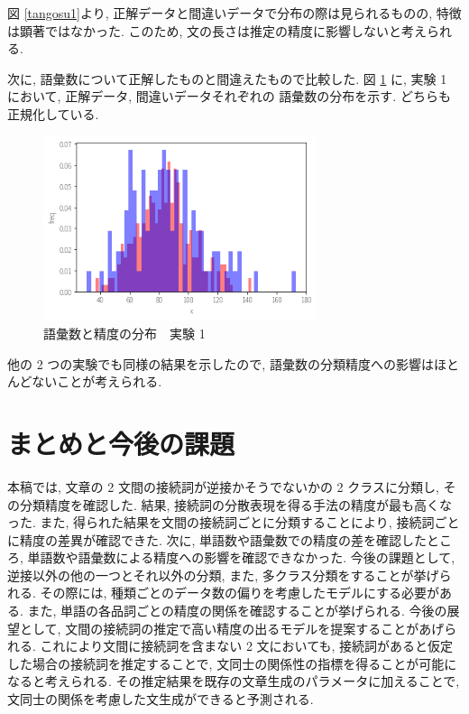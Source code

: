 \documentclass[twocolumn]{jarticle}     %
\begin{document}
図 \ref{tangosu1}より, 正解データと間違いデータで分布の際は見られるものの, 特徴は顕著ではなかった.
このため, 文の長さは推定の精度に影響しないと考えられる. \par
次に, 語彙数について正解したものと間違えたもので比較した.
図 \ref{tangosyuruisu} に, 実験 1 において, 正解データ, 間違いデータそれぞれの
語彙数の分布を示す. どちらも正規化している.
\begin{figure}[ht]
	\begin{center}
		\includegraphics[width=80mm]{figure/goisu.png}
		\caption{語彙数と精度の分布　実験 1}
		\label{tangosyuruisu}
	\end{center}
\end{figure}
他の 2 つの実験でも同様の結果を示したので, 語彙数の分類精度への影響はほとんどないことが考えられる.
\section{まとめと今後の課題}
本稿では, 文章の 2 文間の接続詞が逆接かそうでないかの 2 クラスに分類し,
その分類精度を確認した.
結果, 接続詞の分散表現を得る手法の精度が最も高くなった.
また, 得られた結果を文間の接続詞ごとに分類することにより, 接続詞ごとに精度の差異が確認できた.
次に, 単語数や語彙数での精度の差を確認したところ, 単語数や語彙数による精度への影響を確認できなかった.
今後の課題として, 逆接以外の他の一つとそれ以外の分類, また, 多クラス分類をすることが挙げられる.
その際には, 種類ごとのデータ数の偏りを考慮したモデルにする必要がある.
また, 単語の各品詞ごとの精度の関係を確認することが挙げられる.
今後の展望として, 文間の接続詞の推定で高い精度の出るモデルを提案することがあげられる.
これにより文間に接続詞を含まない 2 文においても,
接続詞があると仮定した場合の接続詞を推定することで, 文同士の関係性の指標を得ることが可能になると考えられる.
その推定結果を既存の文章生成のパラメータに加えることで, 文同士の関係を考慮した文生成ができると予測される.

\end{document}
